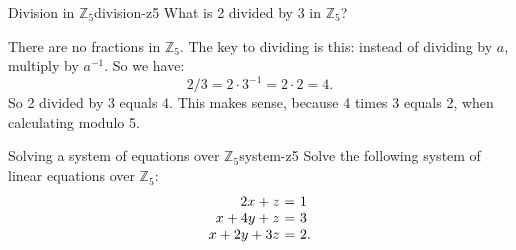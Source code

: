\begin{example}{Division in $\mathbb{Z}_5$}{division-z5}
  What is 2 divided by 3 in $\mathbb{Z}_5$?
\end{example}

\begin{solution}
  There are no fractions in $\mathbb{Z}_5$. The key to dividing is
  this: instead of dividing by $a$, multiply by $a^{-1}$. So we have:
  \begin{equation*}
    2/3 = 2\cdot 3^{-1} = 2\cdot 2 = 4.
  \end{equation*}
  So 2 divided by 3 equals 4. This makes sense, because 4 times 3
  equals 2, when calculating modulo 5.
\end{solution}

\begin{example}{Solving a system of equations over $\mathbb{Z}_5$}{system-z5}
  Solve the following system of linear equations over $\mathbb{Z}_5$:
  \begin{equation*}
    \begin{array}{r@{~}c@{~}l}
      2x + z &=& 1 \\
      x+4y+z &=& 3 \\
      x+2y+3z &=& 2. \\
    \end{array}
  \end{equation*}
\end{example}

